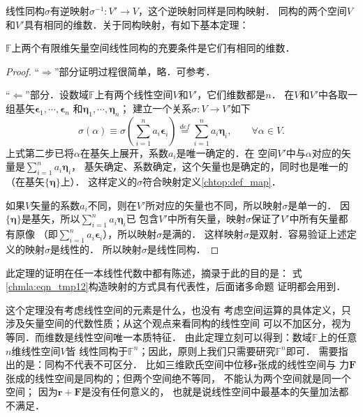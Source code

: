 线性同构$\sigma$有逆映射$\sigma^{-1}:V'\to V$，这个逆映射同样是同构映射．
同构的两个空间$V$和$V'$具有相同的维数．关于同构映射，有如下基本定理：
\begin{theorem}\label{chmla:thm_vvp-basic}
    $\mathbb{F}$上两个有限维矢量空间线性同构的充要条件是它们有相同的维数．
\end{theorem}
\begin{proof}
    “$\Rightarrow$”部分证明过程很简单，略．可参考\parencite[\S 8.3]{qiuws-2019-v2}．

    “$\Leftarrow$”部分．设数域$\mathbb{F}$上有两个线性空间$V$和$V'$，它们维数都是$n$．
    在$V$和$V'$中各取一组基矢$\boldsymbol{\epsilon}_1,\cdots,\boldsymbol{\epsilon}_n$
    和$\boldsymbol{\eta}_1,\cdots,\boldsymbol{\eta}_n$；
    建立一个关系$\sigma : V \to V'$如下
    \begin{equation}\label{chmla:eqn_tmp12}
        \sigma (\alpha) \equiv
        \sigma \left(\sum_{i=1}^{n} a_i \boldsymbol{\epsilon}_i \right)
        \overset{def}{=}
        \sum_{i=1}^{n} a_i \boldsymbol{\eta}_i,
        \qquad \forall \alpha \in V.
    \end{equation}
    上式第二步已将$\alpha$在基矢上展开，系数$a_i$是唯一确定的．在
    空间$V'$中与$\alpha$对应的矢量是$\sum_{i=1}^{n} a_i \boldsymbol{\eta}_i$，
    基矢确定、系数确定，这个矢量也是确定的，同时也是唯一的（在基矢$\{\boldsymbol{\eta}\}$上）．
    这样定义的$\sigma$符合映射定义\ref{chtop:def_map}．

    如果$V$矢量的系数$a_i$不同，则在$V'$所对应的矢量也不同，所以映射$\sigma$是单一的．
    因$\{\boldsymbol{\eta}\}$是基矢，所以$\sum_{i=1}^{n} a_i \boldsymbol{\eta}_i$已
    包含$V'$中所有矢量，映射$\sigma$保证了$V'$中所有矢量都有原像
    （即$\sum_{i=1}^{n} a_i \boldsymbol{\epsilon}_i$），所以映射$\sigma$是满的．
    这样映射$\sigma$是双射．容易验证上述定义的映射$\sigma$是线性的．
    所以映射$\sigma$是线性同构．
\end{proof}
此定理的证明在任一本线性代数中都有陈述，摘录于此的目的是：
式\eqref{chmla:eqn_tmp12}构造映射的方式具有代表性，后面诸多命题
证明都会用到．

这个定理没有考虑线性空间的元素是什么，也没有
考虑空间运算的具体定义，只涉及矢量空间的代数性质；从这个观点来看同构的线性空间
可以不加区分，视为等同．而维数是线性空间唯一本质特征．
由此定理立刻可以得到：数域$\mathbb{F}$上的任意$n$维线性空间$V$皆
线性同构于$\mathbb{F}^n$；因此，原则上我们只需要研究$\mathbb{F}^n$即可．
需要指出的是：同构不代表不可区分．
比如三维欧氏空间中位移$\boldsymbol{r}$张成的线性空间与
力$\boldsymbol{F}$张成的线性空间是同构的；但两个空间绝不等同，
不能认为两个空间就是同一个空间；
因为$\boldsymbol{r}+\boldsymbol{F}$是没有任何意义的，
也就是说线性空间中最基本的矢量加法都不满足．


